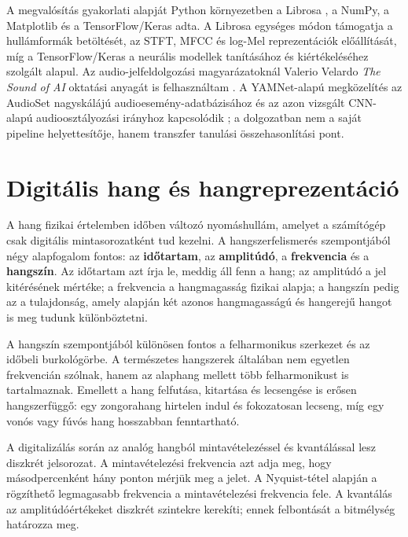A megvalósítás gyakorlati alapját Python környezetben a Librosa \cite{mcfee2015librosa}, a NumPy, a Matplotlib és a TensorFlow/Keras \cite{tensorflow2015-whitepaper} adta. A Librosa egységes módon támogatja a hullámformák betöltését, az STFT, MFCC és log-Mel reprezentációk előállítását, míg a TensorFlow/Keras a neurális modellek tanításához és kiértékeléséhez szolgált alapul. Az audio-jelfeldolgozási magyarázatoknál Valerio Velardo \textit{The Sound of AI} oktatási anyagát is felhasználtam \cite{velardo2020audio}. A YAMNet-alapú megközelítés az AudioSet nagyskálájú audioesemény-adatbázisához és az azon vizsgált CNN-alapú audioosztályozási irányhoz kapcsolódik \cite{gemmeke2017audioset,hershey2017cnn}; a dolgozatban nem a saját pipeline helyettesítője, hanem transzfer tanulási összehasonlítási pont.

\section{Digitális hang és hangreprezentáció}
\label{sec:elmeleti_alapok}

A hang fizikai értelemben időben változó nyomáshullám, amelyet a számítógép csak digitális mintasorozatként tud kezelni. A hangszerfelismerés szempontjából négy alapfogalom fontos: az \textbf{időtartam}, az \textbf{amplitúdó}, a \textbf{frekvencia} és a \textbf{hangszín}. Az időtartam azt írja le, meddig áll fenn a hang; az amplitúdó a jel kitérésének mértéke; a frekvencia a hangmagasság fizikai alapja; a hangszín pedig az a tulajdonság, amely alapján két azonos hangmagasságú és hangerejű hangot is meg tudunk különböztetni.

A hangszín szempontjából különösen fontos a felharmonikus szerkezet és az időbeli burkológörbe. A természetes hangszerek általában nem egyetlen frekvencián szólnak, hanem az alaphang mellett több felharmonikust is tartalmaznak. Emellett a hang felfutása, kitartása és lecsengése is erősen hangszerfüggő: egy zongorahang hirtelen indul és fokozatosan lecseng, míg egy vonós vagy fúvós hang hosszabban fenntartható.

A digitalizálás során az analóg hangból mintavételezéssel és kvantálással lesz diszkrét jelsorozat. A mintavételezési frekvencia azt adja meg, hogy másodpercenként hány ponton mérjük meg a jelet. A Nyquist-tétel alapján a rögzíthető legmagasabb frekvencia a mintavételezési frekvencia fele. A kvantálás az amplitúdóértékeket diszkrét szintekre kerekíti; ennek felbontását a bitmélység határozza meg.

